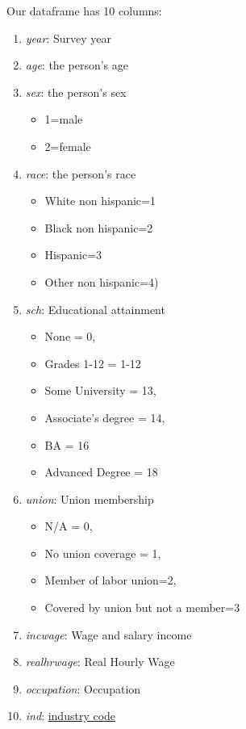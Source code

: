 \documentclass[
  letterpaper,
  DIV=11,
  numbers=noendperiod]{scrreprt}
\providecommand{\tightlist}{%
  \setlength{\itemsep}{0pt}\setlength{\parskip}{0pt}}\usepackage{longtable,booktabs,array}
\begin{document}
Our dataframe has 10 columns:

\begin{enumerate}
\def\labelenumi{\arabic{enumi}.}
\tightlist
\item
  \emph{year}: Survey year
\item
  \emph{age}: the person's age
\item
  \emph{sex}: the person's sex

  \begin{itemize}
  \tightlist
  \item
    1=male
  \item
    2=female
  \end{itemize}
\item
  \emph{race}: the person's race

  \begin{itemize}
  \tightlist
  \item
    White non hispanic=1
  \item
    Black non hispanic=2
  \item
    Hispanic=3
  \item
    Other non hispanic=4)
  \end{itemize}
\item
  \emph{sch}: Educational attainment

  \begin{itemize}
  \tightlist
  \item
    None = 0,
  \item
    Grades 1-12 = 1-12
  \item
    Some University = 13,
  \item
    Associate's degree = 14,
  \item
    BA = 16
  \item
    Advanced Degree = 18
  \end{itemize}
\item
  \emph{union}: Union membership

  \begin{itemize}
  \tightlist
  \item
    N/A = 0,
  \item
    No union coverage = 1,
  \item
    Member of labor union=2,
  \item
    Covered by union but not a member=3
  \end{itemize}
\item
  \emph{incwage}: Wage and salary income
\item
  \emph{realhrwage}: Real Hourly Wage
\item
  \emph{occupation}: Occupation
\item
  \emph{ind}:
  \href{https://www.census.gov/naics/?58967?yearbck=2002}{industry code}
\end{enumerate}
\end{document}

